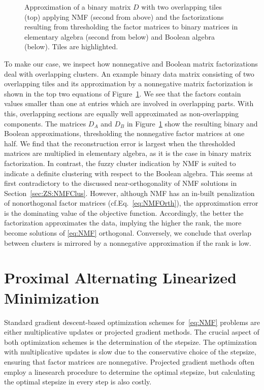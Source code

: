 \begin{figure}
\centering

\caption{Approximation of a binary matrix $D$ with two overlapping tiles (top) applying NMF (second from above) and the factorizations resulting from thresholding the factor matrices to binary matrices in elementary algebra (second from below) and Boolean algebra (below). Tiles are highlighted.}
\label{fig:overlapFact}
\end{figure}
To make our case, we inspect how nonnegative and Boolean matrix factorizations deal with overlapping clusters. An example binary data matrix consisting of two  overlapping tiles and its approximation by a nonnegative matrix factorization is shown in the top two equations of Figure~\ref{fig:overlapFact}. We see that the factors contain values smaller than one at entries which are involved in overlapping parts. With this, overlapping sections are equally well approximated as non-overlapping components. 
The matrices $D_A$ and $D_B$ in Figure~\ref{fig:overlapFact} show the resulting binary and Boolean approximations, thresholding the nonnegative factor matrices at one half. We find that the reconstruction error is largest when the thresholded matrices are multiplied in elementary algebra, as it is the case in binary matrix factorization. In contrast, the fuzzy cluster indication by NMF is suited to indicate a definite clustering with respect to the Boolean algebra. This seems at first contradictory to the discussed near-orthogonality of NMF solutions in Section~\ref{sec:ZS:NMFClus}. However, although NMF has an in-built penalization of nonorthogonal factor matrices (cf.\@ Eq.~\eqref{eq:NMFOrth}), the approximation error is the dominating value of the objective function. Accordingly, the better the factorization approximates the data, implying the higher the rank, the more become solutions of \ref{eq:NMF} orthogonal. Conversely, we conclude that overlap between clusters is mirrored by a nonnegative approximation if the rank is low.   
\section{Proximal Alternating Linearized Minimization}
Standard gradient descent-based optimization schemes for~\ref{eq:NMF} problems are either multiplicative updates or projected gradient methods. The crucial aspect of both optimization schemes is the determination of the stepsize. The optimization with multiplicative updates is slow due to the conservative choice  of the stepsize, ensuring that factor matrices are nonnegative. Projected gradient methods often employ a linesearch procedure to determine the optimal stepsize, but calculating the optimal stepsize in every step is also costly.

